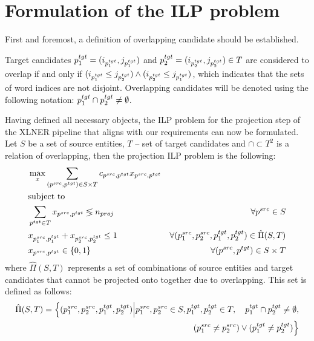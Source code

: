 \section{Formulation of the ILP problem}
First and foremost, a definition of overlapping candidate should be established.

\begin{definition} \label{def:overlapping}
  Target candidates \( p_1^{tgt} = (i_{p_1^{tgt}}, j_{p_1^{tgt}}) \) and \linebreak
  \( p_2^{tgt} = (i_{p_2^{tgt}}, j_{p_2^{tgt}}) \in T \) are considered to overlap
  if and only if \( ( i_{p_1^{tgt}} \leq j_{p_2^{tgt}} ) \land ( i_{p_2^{tgt}} \leq j_{p_1^{tgt}} ) \),
  which indicates that the sets of word indices are not disjoint. Overlapping candidates
  will be denoted using the following notation: \( p_1^{tgt} \cap p_2^{tgt} \neq \emptyset \).
\end{definition}

Having defined all necessary objects, the ILP problem for the projection step of the XLNER pipeline that
aligns with our requirements can now be formulated.
Let \( S \) be a set of source entities, \( T \) -- set of target candidates and \( \cap \subset T^2 \) is
a relation of overlapping, then the projection ILP problem is the following:
\begin{align}
  \label{eq:objective}
  & \max\limits_x \sum\limits_{(p^{src}, p^{tgt}) \in S \times T} c_{p^{src}, p^{tgt}} x_{p^{src}, p^{tgt}}                                             \\
  & \text{subject to} \notag                                                                                                                            \\
  \label{eq:num_proj_const}
  & \sum\limits_{p^{tgt} \in T} x_{p^{src}, p^{tgt}} \lessgtr n_{proj}                                      & \forall p^{src} \in S                     \\
  \label{eq:non_overlap_const}
  & x_{p_1^{src}, p_1^{tgt}} + x_{p_2^{src}, p_2^{tgt}} \leq 1
  & \forall (p_1^{src}, p_2^{src}, p_1^{tgt}, p_2^{tgt}) \in \hat{\Pi}(S, T)                                                                            \\
  \label{eq:binary_prog}
  & x_{p^{src}, p^{tgt}} \in \{ 0, 1 \}                                                                     & \forall (p^{src}, p^{tgt}) \in S \times T
\end{align}
where \( \hat{\Pi}(S, T) \) represents a set of combinations of
source entities and target candidates that cannot be projected onto
together due to overlapping. This set is defined as follows:
\begin{equation}  \label{eq:overlapping_set}
  \begin{aligned}
    \hat{\Pi}(S, T) = \Big\{ (p_1^{src}, p_2^{src}, p_1^{tgt}, p_2^{tgt}) \Big| p_1^{src}, p_2^{src} \in S, p_1^{tgt}, p_2^{tgt} \in T, \quad p_1^{tgt} \cap p_2^{tgt} \neq \emptyset, \\
    (p_1^{src} \neq p_2^{src}) \lor (p_1^{tgt} \neq p_2^{tgt}) \Big\}
  \end{aligned}
\end{equation}

